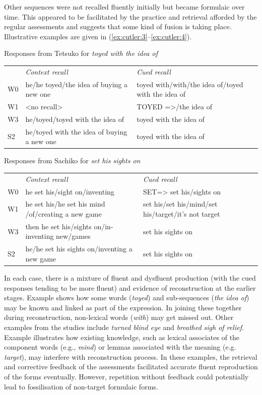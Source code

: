 \documentclass[output=paper]{langscibook}
\begin{document}
Other sequences were not recalled fluently initially but became formulaic over time. This appeared to be facilitated by the practice and retrieval afforded by the regular assessments and suggests that some kind of fusion is taking place. Illustrative examples are given in (\ref{ex:cutler:3}--\ref{ex:cutler:4}). 


\ea Responses from Tetsuko for \textit{toyed with the idea of}\smallskip\\\label{ex:cutler:3}
\begin{tabularx}{\linewidth}{@{}lQQ@{}}
& {\itshape Context recall} & {\itshape Cued recall}\\
{W0} & {he\slash he toyed\slash the idea of buying a new one} & {toyed with\slash with\slash the idea of\slash toyed with the idea of}\\
{W1} & {<no recall>} & {TOYED =>\slash the idea of}\\
{W3} & {he\slash toyed\slash toyed with the idea of} & {toyed with the idea of}\\
{S2} & {he\slash toyed with the idea of buying a new one} & {toyed with the idea of}\\
\end{tabularx}
\ex Responses from Sachiko for \textit{set his sights on}\smallskip\label{ex:cutler:4}
\begin{tabularx}{\linewidth}{@{}lQQ@{}}
& {\itshape Context recall} & {\itshape Cued recall}\\
{W0} & {he set his\slash sight on\slash inventing}  & {SET=> set his\slash sights on}\\
{W1} & {he set his\slash he set his mind \newline\slash of\slash creating a new game} & {set his\slash set his\slash mind\slash set his\slash target\slash it’s not target} \\
{W3} & {then he set his\slash sights on\slash in- inventing new\slash games} & {set his sights on}\\
{S2} & {he\slash he set his sights on\slash inventing a new game} & {set his sights on}\\
\end{tabularx}
\z

In each case, there is a mixture of fluent and dysfluent production (with the cued responses tending to be more fluent) and evidence of reconstruction at the earlier stages. Example  shows how some words (\textit{toyed}) and sub-sequences (\textit{the idea of}) may be known and linked as part of the expression. In joining these together during reconstruction, non-lexical words (\textit{with}) may get missed out. Other examples from the studies include \textit{turned blind eye} and \textit{breathed sigh of relief}. Example  illustrates how existing knowledge, such as lexical associates of the component words (e.g., \textit{mind}) or lemmas associated with the meaning (e.g. \textit{target}), may interfere with reconstruction process. In these examples, the retrieval and corrective feedback of the assessments facilitated accurate fluent reproduction of the forms eventually. However, repetition without feedback could potentially lead to fossilisation of non-target formulaic forms.
\end{document}
